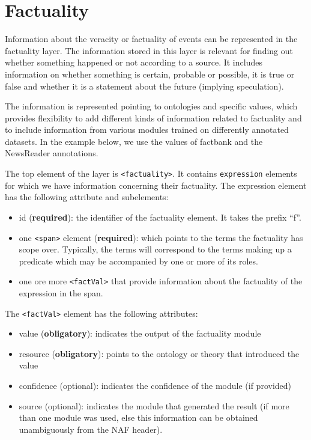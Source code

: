 \section{Factuality}
\label{sec:factuality}

Information about the veracity or factuality of events can be represented in the factuality layer. The information stored in this layer is relevant for finding out whether something happened or not according to a source. It includes information on whether something is certain, probable or possible, it is true or false and whether it is a statement about the future (implying speculation).

The  information is represented pointing to ontologies and specific values, which provides flexibility to add different kinds of information related to factuality and to include information from various modules trained on differently annotated datasets. In the example below, we use the values of factbank and the NewsReader annotations.

The top element of the layer is {\tt <factuality>}. It contains {\tt expression} elements for which we have information concerning their factuality. The expression element has the following attribute and subelements:

\begin{itemize}
\item id (\textbf{required}): the identifier of the factuality element. It takes the prefix ``f''.
\item one {\tt <span>} element (\textbf{required}): which points to the terms the factuality has scope over. Typically, the terms will correspond to the terms making up a predicate which may be accompanied by one or more of its roles. 
\item one ore more {\tt <factVal>} that provide information about the factuality of the expression in the span.
\end{itemize}

The {\tt <factVal>} element has the following attributes:

\begin{itemize}
\item value (\textbf{obligatory}): indicates the output of the factuality module
\item resource (\textbf{obligatory}): points to the ontology or theory that introduced the value
\item confidence (optional): indicates the confidence of the module (if provided)
\item source (optional): indicates the module that generated the result (if more than one module was used, else this information can be obtained unambiguously from the NAF header).
\end{itemize}


